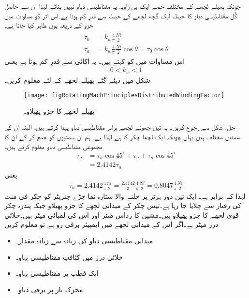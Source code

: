 چونکہ پھیلے لچھے کے مختلف حصے ایک ہی زاویہ پہ مقناطیسی دباو نہیں بناتے لہٰذا ان سے حاصل کُل مقناطیسی دباو کا حیطہ ایک گچھ لچھے  کے حیطہ سے قدرِ کم ہوتا ہے۔اس اثر کو مساوات  میں جزو  کے ذریعہ یوں ظاہر کیا جاتا ہے۔
\begin{gather}
\begin{aligned}
\tau_0&=k_w \frac{4}{\pi}\frac{N i}{2}\\
\tau_{a}&=k_w \frac{4}{\pi}\frac{N i}{2} \cos \theta=\tau_0 \cos \theta \label{مساوات_گھومتے_مشین_دباو_سائن_نما}
\end{aligned}
\end{gather}
اس مساوات میں  کو   کہتے ہیں۔ یہ  اکائی سے قدرِ کم ہوتا ہے یعنی
\begin{align}
0<k_w<1
\end{align}
%
شکل   میں دیئے گئے پھیلے لچھے کے لئے  معلوم کریں۔
\begin{figure}
\centering
\texttt{[image: figRotatingMachPrinciplesDistributedWindingFactor]}
\caption{پھیلے لچھے کا جزو پھیلاو۔}
\label{شکل_گھومتے_مشین_جزو_پھیلاو}
\end{figure}

حل: شکل   سے رجوع کریں۔ یہ تین چھوٹے لچھے برابر مقناطیسی دباو  پیدا کرتے ہیں، البتہ ان کی سمتیں مختلف ہیں۔یہاں چونکہ ایک لچھا   چکر کا ہے لہٰذا  ہے۔ ہم ان سمتیوں کو جمع کر کے ان کا مجموعی مقناطیسی دباو  معلوم کرتے ہیں۔
\begin{align*}
\tau_a&=\tau_n \cos 45^\circ+\tau_n+\tau_n \cos 45^\circ\\
&=2.4142 \tau_n
\end{align*}
یعنی
\begin{align*}
\tau_a=2.4142 \frac{4}{\pi}\frac{ni}{2}=\frac{2.4142}{3} \frac{4}{\pi}\frac{N i}{2}=0.8047 \frac{4}{\pi}\frac{N i}{2}
\end{align*}
لہٰذا  کے برابر ہے۔
%
ایک تین دور  ہرٹز پر چلنے والا ستارہ نما جڑے جنریٹر کو   چکر فی منٹ کی رفتار سے چلایا جا رہا ہے۔تیس چکر کے میدانی لچھے  کا جزو پھیلاو  جبکہ پندرہ چکر قوی لچھے کا جزو پھیلاو  ہیں۔مشین کا رداس  میٹر اور اس  کی لمبائی  میٹر ہیں۔خلائی درز  میٹر ہے۔اگر اس کے میدانی لچھے میں   ایمپیئر برقی رو ہے تو معلوم کریں
\begin{itemize}
\item
میدانی مقناطیسی دباو کی زیادہ سے زیادہ مقدار۔
\item
خلائی درز میں کثافتِ مقناطیسی بہاو۔
\item
ایک قطب پر مقناطیسی بہاو۔
\item
محرک تار پر برقی دباو۔
\end{itemize}

